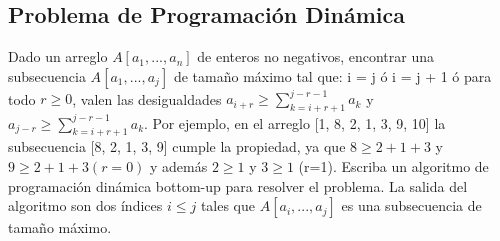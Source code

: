 \documentclass[10pt]{article}
\begin{document}
	\subsection*{Problema de Programaci\'on Din\'amica}
	Dado un arreglo $A[a_1,...,a_n]$ de enteros no negativos, encontrar una subsecuencia $A[a_1,...,a_j]$ de tama\~no m\'aximo tal que: i = j  \'o  i = j + 1 \'o para todo $r \geq 0$, valen las desigualdades $a_{i+r} \geq \sum_{k=i+r+1}^{j-r-1}a_k $ y $ a_{j-r} \geq \sum_{k=i+r+1}^{j-r-1}a_k$.
	Por ejemplo, en el arreglo [1, 8, 2, 1, 3, 9, 10] la subsecuencia [8, 2, 1, 3, 9] cumple la propiedad, ya que $ 8 \geq 2 + 1 + 3 $ y $ 9 \geq 2 + 1 + 3 (r=0) $ y adem\'as $ 2 \geq 1 $ y $ 3 \geq 1 $ (r=1).
	Escriba un algoritmo de programaci\'on din\'amica bottom-up para resolver el problema. La salida del algoritmo son dos \'indices $ i \leq j $ tales que $A[a_i,...,a_j]$ es una subsecuencia de tama\~no m\'aximo.
\end{document}
